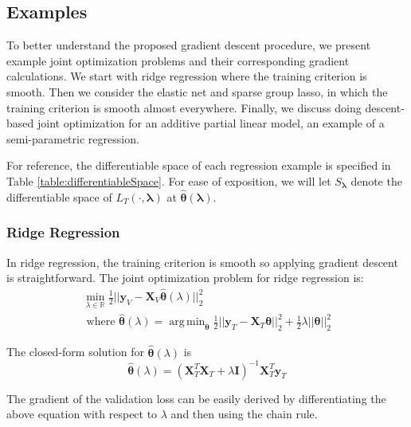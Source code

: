 \documentclass[10pt,letterpaper]{article}
\DeclareMathOperator*{\argmin}{arg\,min}
\begin{document}
\subsection{Examples}

To better understand the proposed gradient descent procedure, we present example joint optimization problems and their corresponding gradient calculations. We start with ridge regression where the training criterion is smooth. Then we consider the elastic net and sparse group lasso, in which the training criterion is smooth almost everywhere. Finally, we discuss doing descent-based joint optimization for an additive partial linear model, an example of a semi-parametric regression.

For reference, the differentiable space of each regression example is specified in Table \ref{table:differentiableSpace}. For ease of exposition, we will let $S_{\boldsymbol{\lambda}}$ denote the differentiable space of $L_T(\cdot, \boldsymbol{\lambda})$ at $\hat{\boldsymbol{\theta}}(\boldsymbol{\lambda})$.

\subsubsection{Ridge Regression}

In ridge regression, the training criterion is smooth so applying gradient descent is straightforward. The joint optimization problem for ridge regression is:
\begin{equation}
\begin{array}{c}
\min_{\lambda\in \mathbb{R}} \frac{1}{2} \lvert\lvert \boldsymbol{y}_V - \boldsymbol{X}_V \hat{\boldsymbol{\theta}} (\lambda) \rvert\rvert_2 ^2 \\
\text{  where  } \hat{\boldsymbol{\theta}} (\lambda) = \argmin_{\boldsymbol{\theta}} \frac{1}{2} \lvert\lvert \boldsymbol{y}_T - \boldsymbol{X}_T \boldsymbol{\theta} \rvert\rvert_2 ^2 + \frac{1}{2} \lambda \lvert\lvert \boldsymbol{\theta} \rvert\rvert_2^2
\end{array}
\end{equation}

The closed-form solution for $\hat{\boldsymbol{\theta}}(\lambda)$ is
\begin{equation}
\hat{\boldsymbol{\theta}} (\lambda) = (\boldsymbol{X}_T^T\boldsymbol{X}_T + \lambda \boldsymbol{I})^{-1}\boldsymbol{X}_T^T\boldsymbol{y}_T
\end{equation}

The gradient of the validation loss can be easily derived by differentiating the above equation with respect to $\lambda$ and then using the chain rule.
\end{document}
